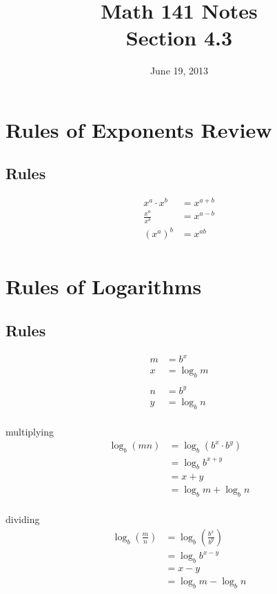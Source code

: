 \documentclass{exam}
\title{Math 141 Notes \\ Section 4.3}
\date{June 19, 2013}
\begin{document}
  \maketitle
  \tableofcontents


  \section{Rules of Exponents Review}

  \subsection{Rules}
  \begin{align*}
    x^a \cdot x^b        &= x^{a + b} \\
    \frac{x^a}{x^b}      &= x^{a - b} \\
    \left( x^a \right)^b &= x^{ab} \\
  \end{align*}

  \section{Rules of Logarithms}

  \subsection{Rules}

  \begin{align*}
    m &= b^x \\
    x &= \log_b m \\
    \\
    n &= b^y \\
    y &= \log_b n \\
  \end{align*}

  multiplying
  \begin{align*}
    \log_b \left( mn \right) &= \log_b \left( b^x \cdot b^y \right) \\
                             &= \log_b b^{x + y} \\
                             &= x + y \\
                             &= \log_b m + \log_b n \\
  \end{align*}

  dividing
  \begin{align*}
    \log_b \left( \frac{m}{n} \right) &= \log_b \left( \frac{b^x}{b^y} \right) \\
                             &= \log_b b^{x - y} \\
                             &= x - y \\
                             &= \log_b m - \log_b n \\
  \end{align*}
\end{document}
